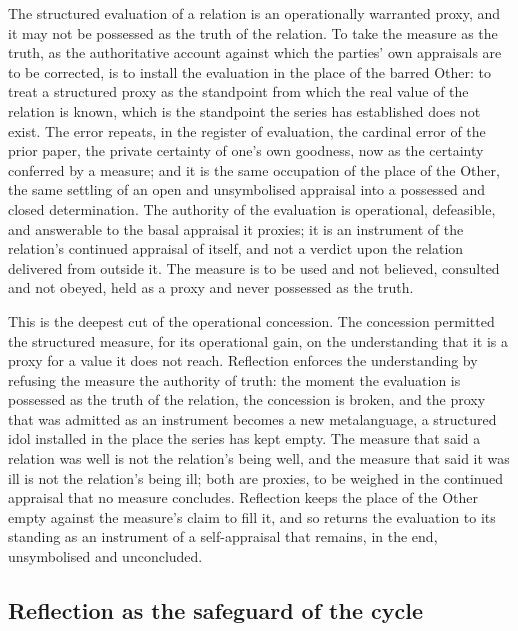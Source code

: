 \begin{claim}
The structured evaluation of a relation is an operationally warranted proxy, and it may not be possessed as the truth of the relation. To take the measure as the truth, as the authoritative account against which the parties' own appraisals are to be corrected, is to install the evaluation in the place of the barred Other: to treat a structured proxy as the standpoint from which the real value of the relation is known, which is the standpoint the series has established does not exist. The error repeats, in the register of evaluation, the cardinal error of the prior paper, the private certainty of one's own goodness, now as the certainty conferred by a measure; and it is the same occupation of the place of the Other, the same settling of an open and unsymbolised appraisal into a possessed and closed determination. The authority of the evaluation is operational, defeasible, and answerable to the basal appraisal it proxies; it is an instrument of the relation's continued appraisal of itself, and not a verdict upon the relation delivered from outside it. The measure is to be used and not believed, consulted and not obeyed, held as a proxy and never possessed as the truth.
\end{claim}

\noindent
This is the deepest cut of the operational concession. The concession permitted the structured measure, for its operational gain, on the understanding that it is a proxy for a value it does not reach. Reflection enforces the understanding by refusing the measure the authority of truth: the moment the evaluation is possessed as the truth of the relation, the concession is broken, and the proxy that was admitted as an instrument becomes a new metalanguage, a structured idol installed in the place the series has kept empty. The measure that said a relation was well is not the relation's being well, and the measure that said it was ill is not the relation's being ill; both are proxies, to be weighed in the continued appraisal that no measure concludes. Reflection keeps the place of the Other empty against the measure's claim to fill it, and so returns the evaluation to its standing as an instrument of a self-appraisal that remains, in the end, unsymbolised and unconcluded.

\subsection{Reflection as the safeguard of the cycle}
\label{p11:sec:ref-safeguard}

